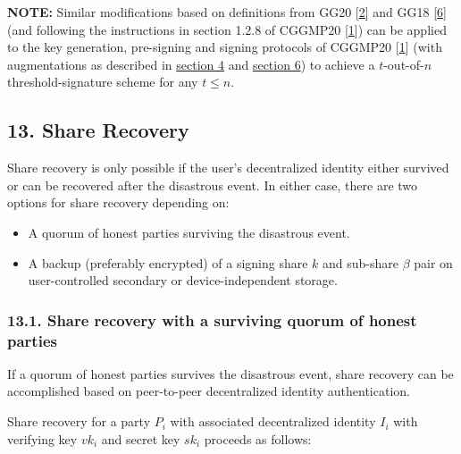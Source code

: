 \documentclass[
]{article}
\providecommand{\tightlist}{%
  \setlength{\itemsep}{0pt}\setlength{\parskip}{0pt}}
\begin{document}
\textbf{NOTE:} Similar modifications based on definitions from GG20
{[}\protect\hyperlink{ref-gg20}{2}{]} and GG18
{[}\protect\hyperlink{ref-gg18}{6}{]} (and following the instructions in
section 1.2.8 of CGGMP20 {[}\protect\hyperlink{ref-cggmp20}{1}{]}) can
be applied to the key generation, pre-signing and signing protocols of
CGGMP20 {[}\protect\hyperlink{ref-cggmp20}{1}{]} (with augmentations as
described in \protect\hyperlink{key-generation}{section 4} and
\protect\hyperlink{signing}{section 6}) to achieve a \(t\)-out-of-\(n\)
threshold-signature scheme for any \(t \leq n\).

\hypertarget{share-recovery}{%
\subsection{13. Share Recovery}\label{share-recovery}}

Share recovery is only possible if the user's decentralized identity
either survived or can be recovered after the disastrous event. In
either case, there are two options for share recovery depending on:

\begin{itemize}
\tightlist
\item
  A quorum of honest parties surviving the disastrous event.
\item
  A backup (preferably encrypted) of a signing share \(k\) and sub-share
  \(\beta\) pair on user-controlled secondary or device-independent
  storage.
\end{itemize}

\hypertarget{share-recovery-quorum}{%
\subsubsection{13.1. Share recovery with a surviving quorum of honest
parties}\label{share-recovery-quorum}}

If a quorum of honest parties survives the disastrous event, share
recovery can be accomplished based on peer-to-peer decentralized
identity authentication.

Share recovery for a party \(P_i\) with associated decentralized
identity \(I_i\) with verifying key \(vk_i\) and secret key \(sk_i\)
proceeds as follows:
\end{document}
